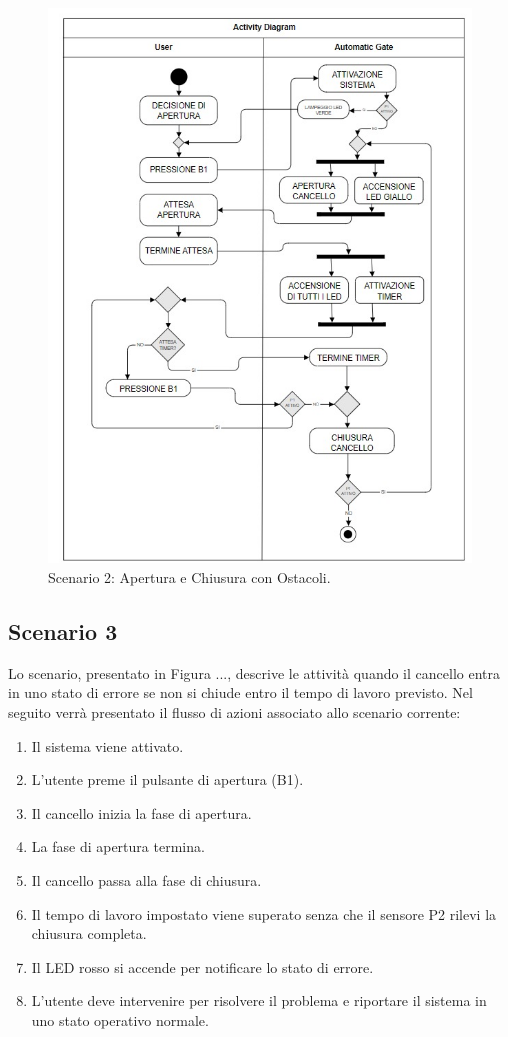 \documentclass[12pt]{article}
\begin{document}
\begin{figure}[h]
    \centering
    \includegraphics[width = 0.7 \textwidth ]{Scenario_2.jpg}
    \caption{Scenario 2: Apertura e Chiusura con Ostacoli.}
    
\end{figure}

\subsection{Scenario 3}
Lo scenario, presentato in Figura ..., descrive le attività quando il cancello entra in uno stato di errore se non si chiude entro il tempo di lavoro previsto. Nel seguito verrà presentato il flusso di azioni associato allo scenario corrente:

\begin{enumerate}
    \item Il sistema viene attivato.
    \item L'utente preme il pulsante di apertura (B1).
    \item Il cancello inizia la fase di apertura.
    \item La fase di apertura termina.
    \item Il cancello passa alla fase di chiusura.
    \item Il tempo di lavoro impostato viene superato senza che il sensore P2 rilevi la chiusura completa.
    \item Il LED rosso si accende per notificare lo stato di errore.
    \item L’utente deve intervenire per risolvere il problema e riportare il sistema in uno stato operativo normale.
\end{enumerate}
\end{document}
